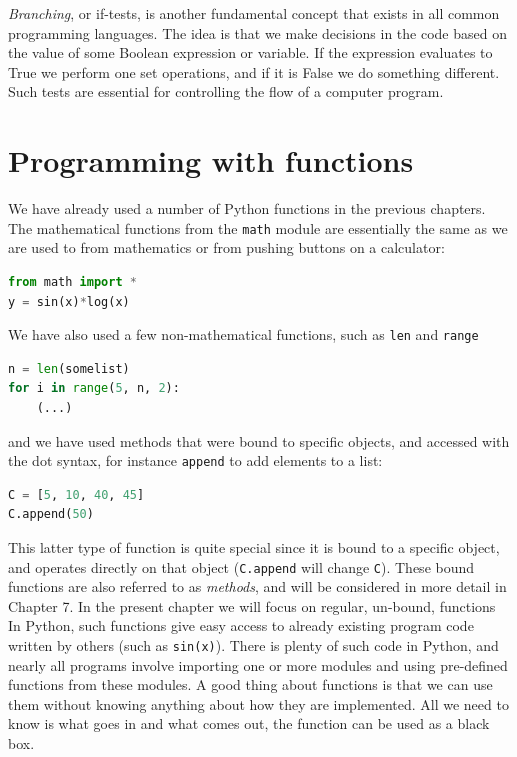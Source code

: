 \documentclass[graybox,envcountchap,sectrefs,final]{svmonodo}
\begin{document}
\emph{Branching}, or if-tests, is another fundamental concept that exists in all common
programming languages. The idea is that we make decisions in the code based on the
value of some Boolean expression or variable. If the expression evaluates to True we perform
one set operations, and if it is False we do something different. Such tests are essential
for controlling the flow of a computer program.

\section{Programming with functions}
We have already used a number of Python functions in the previous chapters. The mathematical
functions from the \texttt{math} module are essentially the same as we are used to from mathematics
or from pushing buttons on a calculator:
\begin{lstlisting}[language=Python,style=blue1]
from math import *
y = sin(x)*log(x)
\end{lstlisting}
We have also used a few non-mathematical functions, such as \texttt{len} and \texttt{range}
\begin{lstlisting}[language=Python,style=blue1]
n = len(somelist)
for i in range(5, n, 2):
    (...)
\end{lstlisting}
and we have used methods that were bound to specific objects, and
accessed with the dot syntax, for instance \texttt{append} to add elements
to a list:
\begin{lstlisting}[language=Python,style=blue1]
C = [5, 10, 40, 45]
C.append(50)
\end{lstlisting}
This latter type of function is quite special since it is bound to a specific object, and operates directly on that
object (\texttt{C.append} will change \texttt{C}). These bound functions are also referred to as \emph{methods}, and will be
considered in more detail in Chapter 7. In the present chapter we will focus on regular, un-bound, functions
In Python, such functions give easy access to already existing
program code written by others (such as \texttt{sin(x)}). There is plenty of such code in Python, and nearly all programs
involve importing one or more modules and using pre-defined functions from these modules. A good thing about
functions is that we can use them without knowing anything about how they are implemented. All we need to know is
what goes in and what comes out, the function can be used as a black box.
\end{document}
